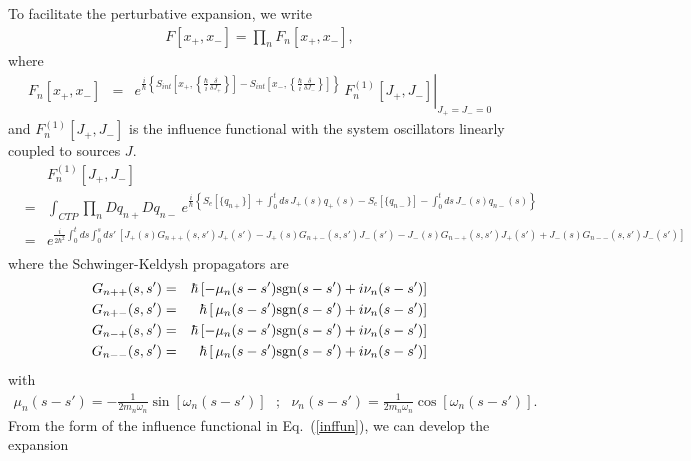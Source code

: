 \documentclass[%
amssymb,preprint,preprintnumbers,nofootinbib,superscriptaddress]{revtex4}
\begin{document}
To facilitate the perturbative expansion, we write
\begin{eqnarray}
    F[x_{+},x_{-}]=\prod_{n}F_{n}[x_{+},x_{-}],
\end{eqnarray}
where 
\begin{eqnarray}\label{inffun}
    F_{n}[x_{+},x_{-}]
    &=&\left.e^{\frac{i}{\hbar}\left\{S_{int}\left[x_{+},\left\{\frac{\hbar}{i}\frac{\delta}{\delta J_{+}}\right\}\right]-S_{int}\left[x_{-},\left\{\frac{\hbar}{i}\frac{\delta}{\delta J_{-}}\right\}\right]\right\}}\ F_{n}^{(1)}[J_{+},J_{-}]\right|_{J_{+}=J_{-}=0}
\end{eqnarray}
and $F_{n}^{(1)}[J_{+},J_{-}]$ is the influence functional with the system oscillators linearly coupled to sources $J$.
\begin{eqnarray}\label{inffunn}
    &&F_{n}^{(1)}[J_{+},J_{-}]\nonumber\\
    &=&\int_{CTP}\prod_{n}Dq_{n+}Dq_{n-}\ \!e^{\frac{i}{\hbar}\left\{S_{e}[\{q_{n+}\}]+\int_{0}^{t}ds\,J_{+}(s)q_{+}(s)-S_{e}[\{q_{n-}\}]-\int_{0}^{t}ds\,J_{-}(s)q_{n-}(s)\right\}}\nonumber\\
    &=&e^{\frac{i}{2\hbar^{2}}\int_{0}^{t}ds\int_{0}^{s}ds'\,\left[J_{+}(s)G_{n++}(s,s')J_{+}(s')-J_{+}(s)G_{n+-}(s,s')J_{-}(s')-J_{-}(s)G_{n-+}(s,s')J_{+}(s')+J_{-}(s)G_{n--}(s,s')J_{-}(s')\right]}\nonumber\\
\end{eqnarray}
where the Schwinger-Keldysh propagators are
\begin{eqnarray}\label{SKpro}
    G_{n++}(s,s')&=&\hbar\left[-\mu_{n}(s-s'){\rm sgn}(s-s')+i\nu_{n}(s-s')\right]\nonumber\\
    G_{n+-}(s,s')&=&\hbar\left[\,\mu_{n}(s-s'){\rm sgn}(s-s')+i\nu_{n}(s-s')\right]\nonumber\\
    G_{n-+}(s,s')&=&\hbar\left[-\mu_{n}(s-s'){\rm sgn}(s-s')+i\nu_{n}(s-s')\right]\nonumber\\
    G_{n--}(s,s')&=&\hbar\left[\,\mu_{n}(s-s'){\rm sgn}(s-s')+i\nu_{n}(s-s')\right]
\end{eqnarray}
with
\begin{eqnarray}
\mu_{n}(s-s')=-\frac{1}{2m_{n}\omega_{n}}\sin[\omega_{n}(s-s')]\ \ \ ;\ \ \ \nu_{n}(s-s')=\frac{1}{2m_{n}\omega_{n}}\cos[\omega_{n}(s-s')].
\end{eqnarray}
From the form of the influence functional in Eq.~(\ref{inffun}), we can develop the expansion
\end{document}
